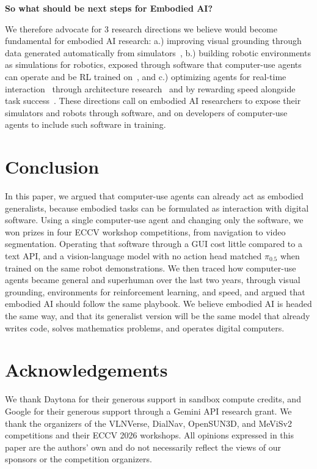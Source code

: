 \documentclass{article}
\begin{document}
\textbf{So what should be next steps for Embodied AI?}

We therefore advocate for 3 research directions we believe would become fundamental for embodied AI research: a.) improving visual grounding through data generated automatically from simulators~\citep{pfaff2026scenesmith,yuan2024robopoint}, b.) building robotic environments as simulations for robotics, exposed through software that computer-use agents can operate and be RL trained on~\citep{aggarwal2026gymanythingrobotics,wang2024robogen,hua2024gensim2}, and c.) optimizing agents for real-time interaction~\citep{aggarwal2026gymanythingrt,tang2026realtimebench} through architecture research~\citep{choudhury2024rlt,tang2026onevision,aggarwal2026vtr} and by rewarding speed alongside task success~\citep{arora2025efficient,aggarwal2025l1}. These directions call on embodied AI researchers to expose their simulators and robots through software, and on developers of computer-use agents to include such software in training.


\section{Conclusion}

In this paper, we argued that computer-use agents can already act as embodied generalists, because embodied tasks can be formulated as interaction with digital software. Using a single computer-use agent and changing only the software, we won prizes in four ECCV workshop competitions, from navigation to video segmentation. Operating that software through a GUI cost little compared to a text API, and a vision-language model with no action head matched $\pi_{0.5}$ when trained on the same robot demonstrations. We then traced how computer-use agents became general and superhuman over the last two years, through visual grounding, environments for reinforcement learning, and speed, and argued that embodied AI should follow the same playbook. We believe embodied AI is headed the same way, and that its generalist version will be the same model that already writes code, solves mathematics problems, and operates digital computers.





\section*{Acknowledgements}

We thank Daytona for their generous support in sandbox compute credits, and Google for their generous support through a Gemini API research grant. We thank the organizers of the VLNVerse, DialNav, OpenSUN3D, and MeViSv2 competitions and their ECCV 2026 workshops. All opinions expressed in this paper are the authors' own and do not necessarily reflect the views of our sponsors or the competition organizers.
\end{document}
